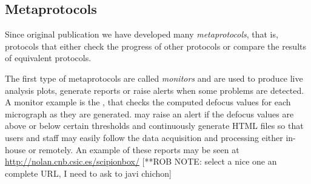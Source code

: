 



\subsection{Metaprotocols}
Since \scipion original publication we have developed many \emph{metaprotocols}, that is, 
protocols that either check the progress of other protocols or compare the results of equivalent protocols.

The first type of metaprotocols are called \emph{monitors} and are used to produce live analysis plots, generate reports or raise alerts when some problems are detected. A monitor example is the , that checks the computed defocus values for each micrograph as they are generated.  may raise an alert if the defocus values are above or below certain thresholds and continuously generate HTML files so that users and staff may easily follow the data acquisition and processing either in-house or remotely. An example of these reports may be seen at \url{http://nolan.cnb.csic.es/scipionbox/} [**ROB NOTE: select a nice one an complete URL, I need to ask to javi chichon]%

